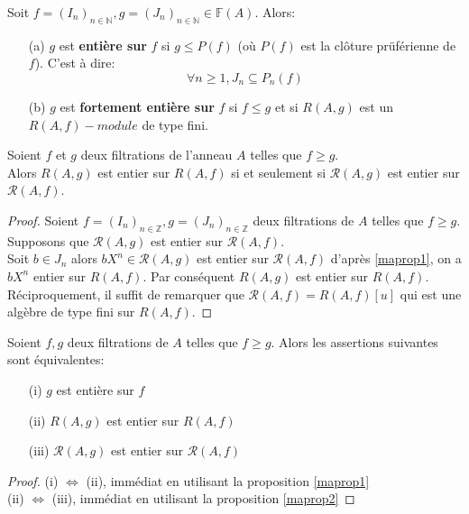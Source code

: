 \begin{madefinition}
	Soit $f=(I_n)_{n \in \mathbb{N}} , g = (J_n)_{n \in \mathbb{N}}\in \mathbb{F}(A)$.  Alors:\\
	\begin{enumerate}
		\item[(a)]$g$ est \textbf{entière sur} $f$ si $g \leqslant P(f)$ (où $P(f)$ est la clôture prüférienne de $f$). C'est à dire:
		\[\forall n \geqslant 1, J_n \subseteq P_{n}(f) \]
		\item[(b)]$g$ est \textbf{fortement entière sur} $f$ si $f \leqslant g$ et si $R(A,g)$ est un $R(A,f)-module$ de type fini.
	\end{enumerate}
\end{madefinition}
\begin{maproposition}
	\label{maprop2}
	Soient $f$ et $g$ deux filtrations de l'anneau $A$ telles que $f \geqslant g$.\\ Alors $R(A,g)$ est entier sur $R(A,f)$ si et seulement si $\mathcal{R}(A,g)$ est entier sur $\mathcal{R}(A,f)$. 
\end{maproposition}
\begin{proof}
	Soient $f=(I_n)_{n \in \mathbb{Z}},g=(J_n)_{n \in \mathbb{Z}}$ deux filtrations de $A$ telles que $f \geqslant g$. \\ Supposons que $\mathcal{R}(A,g)$ est entier sur $\mathcal{R}(A,f)$. \\
	Soit $b \in J_n$ alors $bX^n \in \mathcal{R}(A,g)$ est entier sur $\mathcal{R}(A,f)$ d'après \ref{maprop1}, on a $bX^n$ entier sur $R(A,f)$. Par conséquent $R(A,g)$ est entier sur $R(A,f)$.
	Réciproquement, il suffit de remarquer que $\mathcal{R}(A,f)=R(A,f)[u]$ qui est une algèbre de type fini sur $R(A,f)$.
\end{proof}
\begin{maproposition}
	Soient $f,g$ deux filtrations de $A$ telles que $f \geqslant g$. Alors les assertions suivantes sont équivalentes:
	\begin{enumerate}
		\item[(i)] $g$ est entière sur $f$
		\item[(ii)] $R(A,g)$ est entier sur $R(A,f)$
		\item[(iii)] $\mathcal{R}(A,g)$ est entier sur $\mathcal{R}(A,f)$
	\end{enumerate}
\end{maproposition}
\begin{proof}
	(i) $\Longleftrightarrow$ (ii), immédiat en utilisant la proposition \ref{maprop1} \\
	(ii) $\Longleftrightarrow$ (iii), immédiat en utilisant la proposition \ref{maprop2}
\end{proof}
